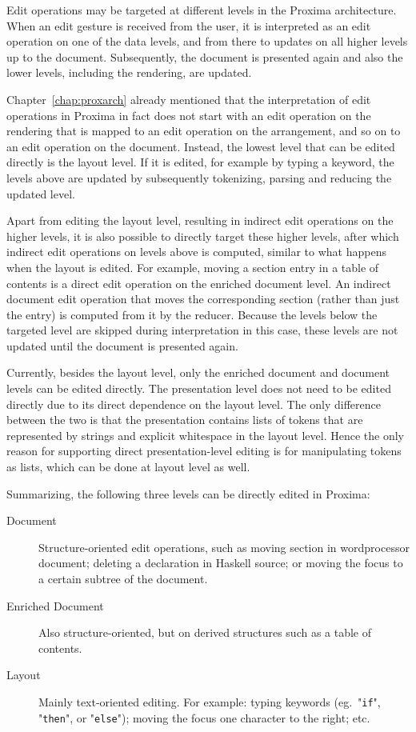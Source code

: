 
\bc Edit operations may be targeted at different levels in the Proxima architecture. When an edit gesture is received from the user, it is interpreted as an edit operation on one of the data levels, and from there to updates on all higher levels up to the document. Subsequently, the document is presented again and also the lower levels, including the rendering, are updated. \ec

Chapter~\ref{chap:proxarch} already mentioned that the interpretation of edit operations in Proxima in fact does not start with an edit operation on the rendering that is mapped to an edit operation on the arrangement, and so on to an edit operation on the document. Instead, the lowest level that can be edited directly is the layout level. If it is edited, for example by typing a keyword, the levels above are updated by subsequently tokenizing, parsing and reducing the updated level.

Apart from editing the layout level, resulting in indirect edit operations on the higher levels, it is also possible to directly target these higher levels, after which indirect edit operations on levels above is computed, similar to what happens when the layout is edited. For example, moving a section entry in a table of contents is a direct edit operation on the enriched document level. An indirect document edit operation that moves the corresponding section (rather than just the entry) is computed from it by the reducer. Because the levels below the targeted level are skipped during interpretation in this case, these levels are not updated until the document is presented again. 

Currently, besides the layout level, only the enriched document and document levels can be edited directly. The presentation level does not need to be edited directly due to its direct dependence on the layout level. The only difference between the two is that the presentation contains lists of tokens that are represented by strings and explicit whitespace in the layout level. Hence the only reason for supporting direct presentation-level editing is for manipulating tokens as lists, which can be done at layout level as well.

Summarizing, the following three levels can be directly edited in Proxima:

\begin{description}
\item[Document] Structure-oriented edit operations, such as moving section in wordprocessor document; deleting a declaration in Haskell source; or moving the focus to a certain subtree of the document.
\item[Enriched Document] Also structure-oriented, but on derived structures such as a table of contents.
\item[Layout] Mainly text-oriented editing. For example: typing keywords (eg.\ "\verb|if|", "\verb|then|", or "\verb|else|"); moving the focus one character to the right; etc.
\end{description}

